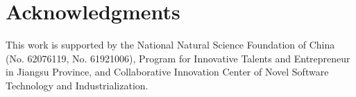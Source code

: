 \documentclass[letterpaper]{article} \usepackage{aaai22}  \usepackage{times}  \usepackage{helvet}  \usepackage{courier}  \usepackage[hyphens]{url}  \usepackage{graphicx} \urlstyle{rm} \def\UrlFont{\rm}  \usepackage{natbib}  \usepackage{caption} \DeclareCaptionStyle{ruled}{labelfont=normalfont,labelsep=colon,strut=off} \frenchspacing  \setlength{\pdfpagewidth}{8.5in}  \setlength{\pdfpageheight}{11in}  \usepackage{algorithm}
\begin{document}
\section{Acknowledgments}


This work is supported by the National Natural Science Foundation of China (No. 62076119, No. 61921006), Program for Innovative Talents and Entrepreneur in Jiangsu Province, and Collaborative Innovation Center of Novel Software Technology and Industrialization. 


\end{document}
